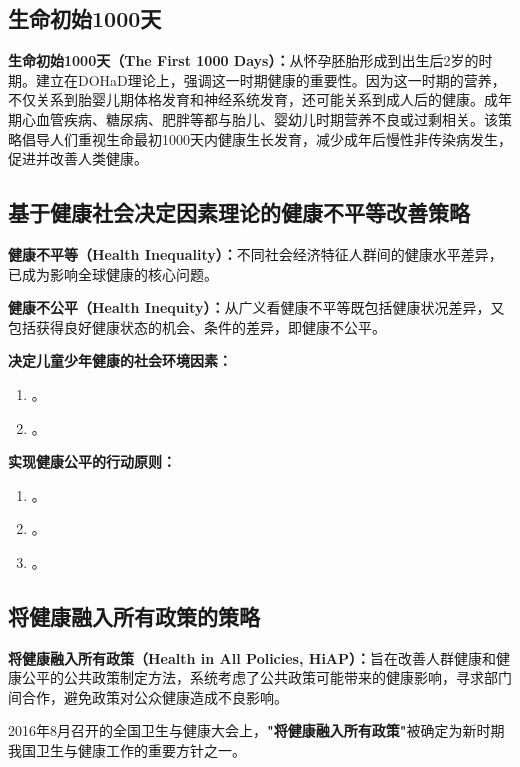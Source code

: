 \subsection{生命初始1000天}

\begin{keybox}
\textbf{生命初始1000天（The First 1000 Days）：}从怀孕胚胎形成到出生后2岁的时期。建立在DOHaD理论上，强调这一时期健康的重要性。因为这一时期的营养，不仅关系到胎婴儿期体格发育和神经系统发育，还可能关系到成人后的健康。成年期心血管疾病、糖尿病、肥胖等都与胎儿、婴幼儿时期营养不良或过剩相关。该策略倡导人们重视生命最初1000天内健康生长发育，减少成年后慢性非传染病发生，促进并改善人类健康。
\end{keybox}

\subsection{基于健康社会决定因素理论的健康不平等改善策略}

\begin{defbox}
\textbf{健康不平等（Health Inequality）：}不同社会经济特征人群间的健康水平差异，已成为影响全球健康的核心问题。

\textbf{健康不公平（Health Inequity）：}从广义看健康不平等既包括健康状况差异，又包括获得良好健康状态的机会、条件的差异，即健康不公平。
\end{defbox}

\begin{defbox}
\textbf{决定儿童少年健康的社会环境因素：}

\begin{enumerate}[leftmargin=*]
    \item {}。
    \item {}。
\end{enumerate}

\textbf{实现健康公平的行动原则：}

\begin{enumerate}[leftmargin=*]
    \item {}。
    \item {}。
    \item {}。
\end{enumerate}
\end{defbox}

\subsection{将健康融入所有政策的策略}

\begin{keybox}
\textbf{将健康融入所有政策（Health in All Policies, HiAP）：}旨在改善人群健康和健康公平的公共政策制定方法，系统考虑了公共政策可能带来的健康影响，寻求部门间合作，避免政策对公众健康造成不良影响。

2016年8月召开的全国卫生与健康大会上，\textbf{"将健康融入所有政策"}被确定为新时期我国卫生与健康工作的重要方针之一。
\end{keybox}

\newpage
